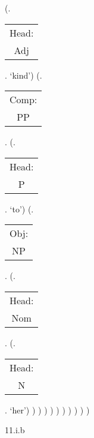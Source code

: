 \documentclass[12pt,letterpaper]{article}
\begin{document}
\begin{figure}
\begin{center}
\begin{parsetree}
			(.\begin{tabular}{c}Head:\\Adj\end{tabular}. `kind')
			(.\begin{tabular}{c}Comp:\\PP\end{tabular}.
			(.\begin{tabular}{c}Head:\\P\end{tabular}. `to')
			(.\begin{tabular}{c}Obj:\\NP\end{tabular}. 
			(.\begin{tabular}{c}Head:\\Nom\end{tabular}. 
			(.\begin{tabular}{c}Head:\\N\end{tabular}. `her')
			)
			)
			)
			)
			)
			)
			)
			)
			)
			)
			
		\end{parsetree}
		\hfill \break \hfill \break
		11.i.b 
	\end{center}
\end{figure}
\end{document}
